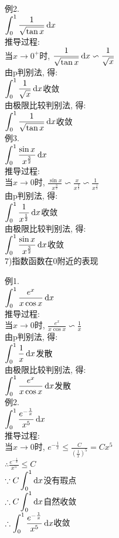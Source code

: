 例2.\\
\phantom{例}$\displaystyle\int_0^1\frac{1}{\sqrt{\tan x}}\mathop{}\!\mathrm{d} x$\\
推导过程:\\
当$x\to 0^+$时, $\displaystyle\frac{1}{\sqrt{\tan x}}\mathop{}\!\mathrm{d} x\backsim\frac{1}{\sqrt{x}}$\\
由p判别法, 得:\\
$\displaystyle\int_0^1\frac{1}{\sqrt{x}}\mathop{}\!\mathrm{d} x$收敛\\
由极限比较判别法, 得:\\
$\displaystyle\int_0^1\frac{1}{\sqrt{\tan x}}\mathop{}\!\mathrm{d} x$收敛\\[1ex]

例3.\\
\phantom{例}$\displaystyle\int_0^1\frac{\sin x}{x^\frac{3}{2}}\mathop{}\!\mathrm{d} x$\\
推导过程:\\
当$x\to 0$时, $\displaystyle\frac{\sin x}{x^\frac{3}{2}}\backsim\frac{x}{x^\frac{3}{2}}\backsim\frac{1}{x^\frac{1}{2}}$\\
由p判别法, 得:\\
$\displaystyle\int_0^1\frac{1}{x^\frac{1}{2}}\mathop{}\!\mathrm{d} x$收敛\\
由极限比较判别法, 得:\\
$\displaystyle\int_0^1\frac{\sin x}{x^\frac{3}{2}}\mathop{}\!\mathrm{d} x$收敛\\[2ex]

7)指数函数在0附近的表现
\begin{center}
\end{center}

例1.\\
\phantom{例}$\displaystyle\int_0^1\frac{e^x}{x\cos x}\mathop{}\!\mathrm{d} x$\\
推导过程:\\
当$x\to 0$时, $\displaystyle\frac{e^x}{x\cos x}\backsim\frac{1}{x}$\\
由p判别法, 得:\\
$\displaystyle\int_0^1\frac{1}{x}\mathop{}\!\mathrm{d} x$发散\\
由极限比较判别法, 得:\\
$\displaystyle\int_0^1\frac{e^x}{x\cos x}\mathop{}\!\mathrm{d} x$发散\\[1ex]

例2.\\
\phantom{例}$\displaystyle\int_0^1\frac{e^{-\frac{1}{x}}}{x^5}\mathop{}\!\mathrm{d} x$\\
推导过程:\\
当$x\to 0$时, $\displaystyle e^{-\frac{1}{x}}\leqslant\frac{C}{(\frac{1}{x})^5}=Cx^5$\\
$\displaystyle\therefore\frac{e^{-\frac{1}{x}}}{x^5}\leqslant C$\\
$\displaystyle\because C\int_0^1\mathop{}\!\mathrm{d} x$没有瑕点\\
$\displaystyle\therefore C\int_0^1\mathop{}\!\mathrm{d} x$自然收敛\\
$\displaystyle\therefore\int_0^1\frac{e^{-\frac{1}{x}}}{x^5}\mathop{}\!\mathrm{d} x$收敛\\[1ex]

